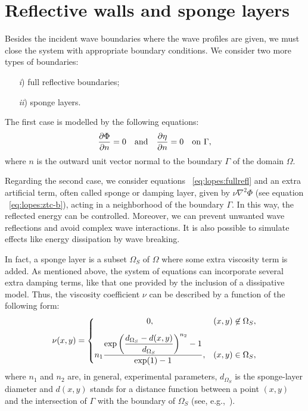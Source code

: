 \section{Reflective walls and sponge layers}\label{sec:lopes:boundaryconditions}

Besides the incident wave boundaries where the wave profiles
are given, we must close the system with appropriate
boundary conditions.  We consider two more types of
boundaries:
\begin{itemize}
\item[{\it i})] full reflective boundaries;
\item[{\it ii})] sponge layers.
\end{itemize}
The first case is modelled by the following equations:
\begin{equation}\label{eq:lopes:fullrefl}
\frac{\partial \Phi}{\partial n}=0\quad {\rm
  and}\quad\frac{\partial \eta}{\partial n}=0\quad {\rm
  on\,\, } \Gamma,
\end{equation}
where $n$ is the outward unit vector normal to the boundary
$\Gamma$ of the domain $\Omega$.

Regarding the second case, we consider equations
~\eqref{eq:lopes:fullrefl} and an extra artificial term,
often called sponge  or damping layer,
given by $\nu\nabla^2\Phi$ (see equation
~\eqref{eq:lopes:ztc-b}), acting in a neighborhood of the
boundary $\Gamma$.  In this way, the reflected energy can be
controlled. Moreover, we can prevent unwanted wave
reflections and avoid complex wave interactions.  It is also
possible to simulate effects like energy dissipation by wave
breaking.

In fact, a sponge layer is a subset $\Omega_S$ of $\Omega$
where some extra viscosity term is added.  As mentioned
above, the system of equations can incorporate several extra
damping terms, like that one provided by the inclusion of a
dissipative model. Thus, the viscosity coefficient $\nu$ can
be described by a function of the following form:
\begin{equation}\label{eq:lopes:sponge}
\nu(x,y)= \left\{
\begin{matrix}
0,& (x,y)\not\in\Omega_S ,\vspace{0.3cm}\\ \displaystyle
n_1\frac{\displaystyle\exp{\left(\frac{d_{\Omega_S}-d(x,y)}
    {d_{\Omega_S}}\right)^{n_2}}-1}{\exp(1)-1},& (x,y)
\in\Omega_S,
\end{matrix}
\right.
\end{equation}
where $n_1$ and $n_2$ are, in general, experimental
parameters, $d_{\Omega_S}$ is the sponge-layer diameter and
$d(x,y)$ stands for a distance function between a point
$(x,y)$ and the intersection of $\Gamma$ with the boundary
of $\Omega_S$ (see, e.g.,~\citet{Walkley1999}).

